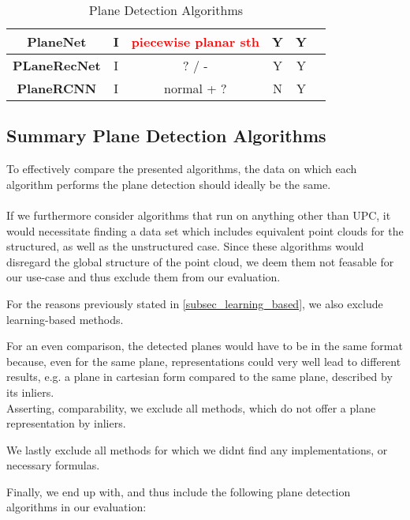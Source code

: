 \documentclass[main.tex]{subfiles}
\begin{document}
\begin{table}[!h]
\begin{tabular}{|c|c|c|c|c|c}
        \textbf{PlaneNet}    & I                   & \textcolor{red}{piecewise planar sth} & Y                       & Y                     \\ \hline
        \textbf{PLaneRecNet} & I                   & ? / -                                 & Y                       & Y                     \\ \hline
        \textbf{PlaneRCNN}   & I                   & normal + ?                            & N                       & Y                     \\ \hline
    \end{tabular}
    \caption{Plane Detection Algorithms}
    \label{tab:my-table}
\end{table}

\subsection*{Summary Plane Detection Algorithms}
To effectively compare the presented algorithms, the data on which each algorithm performs the plane detection should ideally be the same. \\ \\
If we furthermore consider algorithms that run on anything other than UPC, it would necessitate finding a data set which includes equivalent point clouds for the structured, as well as
the unstructured case.
Since these algorithms would disregard the global structure of the point cloud, we deem them not feasable for our use-case and thus exclude them from
our evaluation.

For the reasons previously stated in \ref{subsec_learning_based}, we also exclude learning-based methods.

For an even comparison, the detected planes would have to be in the same format because, even for the same plane, representations could very well
lead to different results, e.g. a plane in cartesian form compared to the same plane, described by its inliers.\\
Asserting, comparability, we exclude all methods, which do not offer a plane representation by inliers.

We lastly exclude all methods for which we didnt find any implementations, or necessary formulas.

Finally, we end up with, and thus include the following plane detection algorithms in our evaluation:
\end{document}
